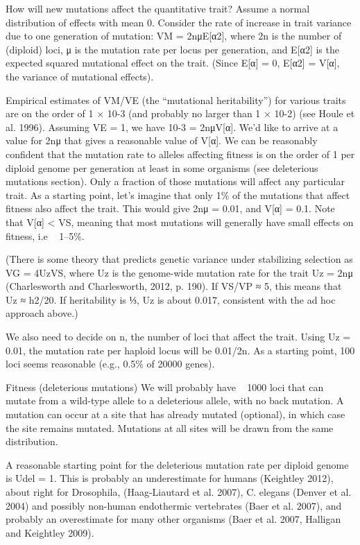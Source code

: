 How will new mutations affect the quantitative trait? Assume a normal distribution of effects with 
mean 0. Consider the rate of increase in trait variance due to one generation of mutation: VM = 2nμE[α2], 
where 2n is the number of (diploid) loci, μ is the mutation rate per locus per generation, and E[α2] is 
the expected squared mutational effect on the trait. (Since E[α] = 0, E[α2] = V[α], the variance of mutational effects).

Empirical estimates of VM/VE (the “mutational heritability”) for various traits are on the order of 
1 × 10-3 (and probably no larger than 1 × 10-2) (see Houle et al. 1996). Assuming VE = 1, we have 10-3 = 2nμV[α]. 
We’d like to arrive at a value for 2nμ that gives a reasonable value of V[α]. We can be reasonably 
confident that the mutation rate to alleles affecting fitness is on the order of 1 per diploid genome 
per generation at least in some organisms (see deleterious mutations section). Only a fraction of those 
mutations will affect any particular trait. As a starting point, let’s imagine that only 1\% 
of the mutations that affect fitness also affect the trait. This would give 2nμ = 0.01, and V[α] = 0.1. 
Note that V[α] < VS, meaning that most mutations will generally have small effects on fitness, i.e ~ 1–5\%.
 
(There is some theory that predicts genetic variance under stabilizing selection as VG = 4UzVS, where Uz 
is the genome-wide mutation rate for the trait Uz = 2nμ (Charlesworth and Charlesworth, 2012, p. 190). 
If VS/VP ≈ 5, this means that Uz ≈ h2/20. If heritability is ⅓, Uz is about 0.017, consistent with the 
ad hoc approach above.)
 
We also need to decide on n, the number of loci that affect the trait. Using Uz = 0.01, the mutation 
rate per haploid locus will be 0.01/2n. As a starting point, 100 loci seems reasonable (e.g., 0.5\% of 20000 genes).


Fitness (deleterious mutations)
We will probably have ~ 1000 loci that can mutate from a wild-type allele to a deleterious allele, 
with no back mutation. A mutation can occur at a site that has already mutated (optional), in which 
case the site remains mutated. Mutations at all sites will be drawn from the same distribution.
 
A reasonable starting point for the deleterious mutation rate per diploid genome is Udel = 1. This 
is probably an underestimate for humans (Keightley 2012), about right for Drosophila, (Haag-Liautard et al. 2007), 
C. elegans (Denver et al. 2004) and possibly non-human endothermic vertebrates (Baer et al. 2007), and 
probably an overestimate for many other organisms (Baer et al. 2007, Halligan and Keightley 2009).
 
